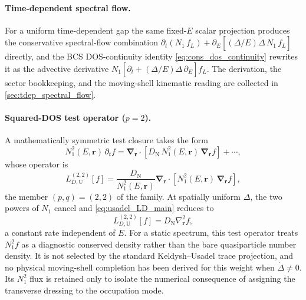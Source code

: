 \documentclass[
  aps,
  prb,
  preprint,
  superscriptaddress,
  longbibliography,
  nofootinbib
]{revtex4-2}
\newcommand{\br}{\mathbf{r}}
\newcommand{\bnabla}{\boldsymbol{\nabla}}
\newcommand{\DOS}{N_1}
\newcommand{\DN}{D_{\mathrm{N}}}
\newcommand{\fL}{f_L}
\begin{document}
\paragraph{Time-dependent spectral flow.} For a uniform time-dependent
gap the same fixed-\(E\) scalar projection produces the conservative
spectral-flow combination
\(\partial_t(\DOS\,\fL)+\partial_E[(\Delta/E)\dot\Delta\,\DOS\,\fL]\)
directly, and the BCS DOS-continuity identity
\cref{eq:cons_dos_continuity} rewrites it as the advective derivative
\(\DOS[\partial_t+(\Delta/E)\dot\Delta\,\partial_E]\fL\). The derivation,
the sector bookkeeping, and the moving-shell kinematic reading are
collected in \cref{sec:tdep_spectral_flow}.

\paragraph{Squared-DOS test operator ($p=2$).} A mathematically symmetric
test closure takes the form
\begin{equation}
  \DOS^2(E,\br)\,\partial_t f
  =
  \bnabla_{\br}\cdot
  \left[\DN\,\DOS^2(E,\br)\,\bnabla_{\br}f\right]
  + \cdots ,
  \label{eq:usadel_weighted_conservative}
\end{equation}
whose operator is
\begin{equation}
  L_{D,\mathrm{U}}^{(2,2)}[f]
  =
  \frac{\DN}{\DOS^2(E,\br)}
  \bnabla_{\br}\cdot
  \left[\DOS^2(E,\br)\,\bnabla_{\br}f\right],
  \label{eq:usadel_LD_main}
\end{equation}
the member \((p,q)=(2,2)\) of the family. At spatially uniform \(\Delta\),
the two powers of \(\DOS\) cancel and \cref{eq:usadel_LD_main} reduces
to
\begin{equation}
  L_{D,\mathrm{U}}^{(2,2)}[f]=\DN\nabla_{\br}^2 f ,
  \label{eq:usadel_uniform_delta}
\end{equation}
a constant rate independent of \(E\). For a static spectrum, this test
operator treats \(\DOS^2f\) as a diagnostic conserved density rather than the
bare quasiparticle number density. It is not selected by the standard
Keldysh--Usadel trace projection, and no physical moving-shell completion has
been derived for this weight when \(\dot\Delta\ne0\). Its \(\DOS^2\) flux is
retained only to isolate the numerical consequence of assigning the transverse
dressing to the occupation mode.
\end{document}
